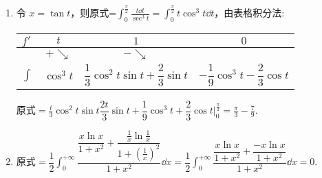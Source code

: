 \begin{solution}
\begin{enumerate}[label=(\arabic{*})]
        \item 令 $x=\tan t$，则原式=$\displaystyle \int_{0}^{\frac{\pi}{2}}\frac{t\dd t}{\sec^3t}=\int_{0}^{\frac{\pi}{2}}t\cos^3t\dd t$，由表格积分法:
              \begin{table}[H]
                  \centering
                  \begin{tabular}{l| c c c}
                      $f'$   & $t$         & $1$                                            & $0$                                       \\
                      \midrule
                             & $+\searrow$ & $-\searrow$                                                                                \\
                      \midrule
                      $\int$ & $\cos^3t$   & $\dfrac{1}{3}\cos^2t\sin t+\dfrac{2}{3}\sin t$ & $-\dfrac{1}{9}\cos^3t-\dfrac{2}{3}\cos t$
                  \end{tabular}
              \end{table}
              $\displaystyle\text{原式}=\frac{t}{3}\cos^2t\sin t\dfrac{2t}{3}\sin t+\dfrac{1}{9}\cos^3t+\dfrac{2}{3}\cos t\bigg |_0^{\frac{\pi}{2}}=\frac{\pi}{3}-\frac{7}{9}.$
        \item $\displaystyle\text{原式}=\dfrac{1}{2}\int_{0}^{+\infty}\dfrac{\dfrac{x\ln x}{1+x^2}+\dfrac{\frac{1}{x}\ln\frac{1}{x}}{1+\left(\frac{1}{x}\right)^2}}{1+x^2}\dd x=\dfrac{1}{2}\int_{0}^{+\infty}\dfrac{\dfrac{x\ln x}{1+x^2}+\dfrac{-x\ln x}{1+x^2}}{1+x^2}\dd x=0.$
    \end{enumerate}
\end{solution}

